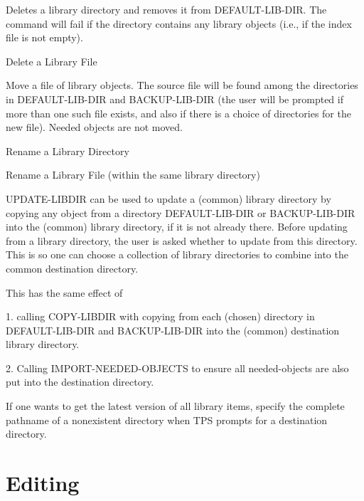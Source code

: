 \begin{description}
\item[DELETE-LIB-DIR]  
Deletes a library directory and removes it from DEFAULT-LIB-DIR.
The command will fail if the directory contains any library objects
(i.e., if the index file is not empty).

\item[DELETE-LIBFILE]  
Delete a Library File

\item[MOVE-LIBFILE]  
Move a file of library objects. The source file will
be found among the directories in DEFAULT-LIB-DIR and BACKUP-LIB-DIR
(the user will be prompted if more than one such file exists, and also
if there is a choice of directories for the new file).
Needed objects are not moved.

\item[RENAME-LIBDIR]  
Rename a Library Directory

\item[RENAME-LIBFILE]  
Rename a Library File (within the same library directory)

\item[UPDATE-LIBDIR]  
UPDATE-LIBDIR can be used to update a (common) library directory
by copying any object from a directory DEFAULT-LIB-DIR or BACKUP-LIB-DIR
into the (common) library directory, if it is not already there.
Before updating from a library directory, the user is asked whether
to update from this directory.  This is so one can choose a collection
of library directories to combine into the common destination directory.

This has the same effect of 

1. calling COPY-LIBDIR with copying from each (chosen) directory in
DEFAULT-LIB-DIR and BACKUP-LIB-DIR into the (common) destination
library directory.

2. Calling IMPORT-NEEDED-OBJECTS to ensure all needed-objects
are also put into the destination directory.

If one wants to get the latest version of all library items,
specify the complete pathname of a nonexistent directory when 
TPS prompts for a destination directory.
\item
\end{description}

\section{Editing}

